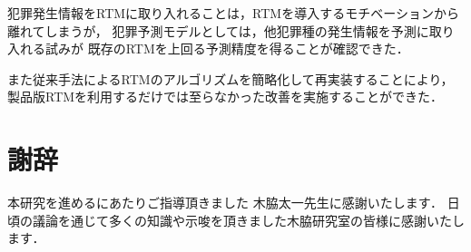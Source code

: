 \documentclass[12pt,a4paper,oneside]{jsbook}
\theoremstyle{plain}
\begin{document}
犯罪発生情報をRTMに取り入れることは，RTMを導入するモチベーションから離れてしまうが，
犯罪予測モデルとしては，他犯罪種の発生情報を予測に取り入れる試みが
既存のRTMを上回る予測精度を得ることが確認できた．

また従来手法によるRTMのアルゴリズムを簡略化して再実装することにより，
製品版RTMを利用するだけでは至らなかった改善を実施することができた．
\chapter*{謝辞}
本研究を進めるにあたりご指導頂きました
木脇太一先生に感謝いたします．
日頃の議論を通じて多くの知識や示唆を頂きました木脇研究室の皆様に感謝いたし
ます．



\end{document}
